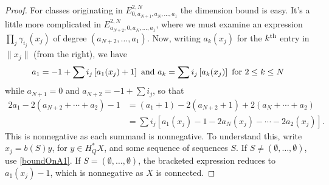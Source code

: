 \documentclass[10pt]{article}
\begin{document}
\begin{proof}
For classes originating in $E^{2,N}_{0,a_{N+1},a_N,\ldots,a_1}$ the dimension bound is easy. It's a little more complicated in $E^{2,N}_{a_{N+2},0,a_N,\ldots,a_1}$, where we must examine an expression $\prod_j\gamma_{i_j}(x_j)$ of degree $(a_{N+2},\ldots,a_1)$. Now, writing $a_k(x_j)$ for the $k^{\textup{th}}$ entry in $\|x_j\|$ (from the right), we have
\[a_1=-1+\sum i_j\left[a_1(x_j)+1\right]\textup{ and }a_k=\sum i_j\left[a_k(x_j)\right]\textup{ for $2\leq k\leq N$}\]
while $a_{N+1}=0$ and $a_{N+2}=-1+\sum i_j$, so that
\begin{alignat*}{2}
a_{1}-2(a_{N+2}+\cdots +a_2)-1
&=
(a_{1}+1)-2(a_{N+2}+1)+2(a_N+\cdots +a_2)%
\\
&=
\sum i_j\left[a_1(x_j)-1-2a_N(x_j)-\cdots -2a_2(x_j)\right].%
\end{alignat*}
This is nonnegative as each summand is nonnegative. To understand this, write $x_j=b(S)y$, for $y\in H^*_QX$, and some sequence of sequences $S$. If $S\neq(\emptyset,\ldots,\emptyset)$, use \ref{boundOnA1}. If $S=(\emptyset,\ldots,\emptyset)$, the bracketed expression reduces to $a_1(x_j)-1$, which is nonnegative as $X$ is connected.
\end{proof}





\newpage
\end{document}
